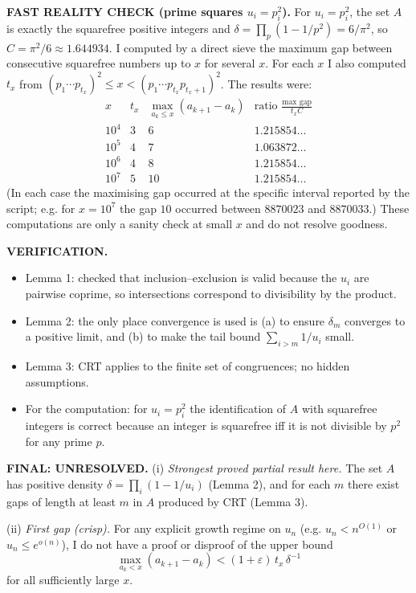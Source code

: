 \medskip
\noindent\textbf{FAST REALITY CHECK (prime squares $u_i=p_i^2$).}
For $u_i=p_i^2$, the set $A$ is exactly the squarefree positive integers and
$\delta=\prod_p(1-1/p^2)=6/\pi^2$, so $C=\pi^2/6\approx 1.644934$.
I computed by a direct sieve the maximum gap between consecutive squarefree numbers up to $x$ for several $x$.
For each $x$ I also computed $t_x$ from $(p_1\cdots p_{t_x})^2\le x < (p_1\cdots p_{t_x}p_{t_x+1})^2$.
The results were:
\[
\begin{array}{c|c|c|c}
 x & t_x & \max_{a_k\le x}(a_{k+1}-a_k) & \text{ratio }\frac{\max\text{ gap}}{t_x C}\\\hline
10^4 & 3 & 6 & 1.215854\dots\\
10^5 & 4 & 7 & 1.063872\dots\\
10^6 & 4 & 8 & 1.215854\dots\\
10^7 & 5 & 10 & 1.215854\dots
\end{array}
\]
(In each case the maximising gap occurred at the specific interval reported by the script; e.g. for $x=10^7$ the gap $10$ occurred between $8870023$ and $8870033$.)
These computations are only a sanity check at small $x$ and do not resolve goodness.

\medskip
\noindent\textbf{VERIFICATION.}
\begin{itemize}
\item Lemma 1: checked that inclusion--exclusion is valid because the $u_i$ are pairwise coprime, so intersections correspond to divisibility by the product.
\item Lemma 2: the only place convergence is used is (a) to ensure $\delta_m$ converges to a positive limit, and (b) to make the tail bound $\sum_{i>m}1/u_i$ small.
\item Lemma 3: CRT applies to the finite set of congruences; no hidden assumptions.
\item For the computation: for $u_i=p_i^2$ the identification of $A$ with squarefree integers is correct because an integer is squarefree iff it is not divisible by $p^2$ for any prime $p$.
\end{itemize}

\medskip
\noindent\textbf{FINAL: \textbf{UNRESOLVED}.}
(i) \emph{Strongest proved partial result here.} The set $A$ has positive density $\delta=\prod_i(1-1/u_i)$ (Lemma 2), and for each $m$ there exist gaps of length at least $m$ in $A$ produced by CRT (Lemma 3).

(ii) \emph{First gap (crisp).} For any explicit growth regime on $u_n$ (e.g. $u_n<n^{O(1)}$ or $u_n\le e^{o(n)}$), I do not have a proof or disproof of the upper bound
\[\max_{a_k<x}(a_{k+1}-a_k) < (1+\varepsilon)\,t_x\,\delta^{-1}\]
for all sufficiently large $x$.


